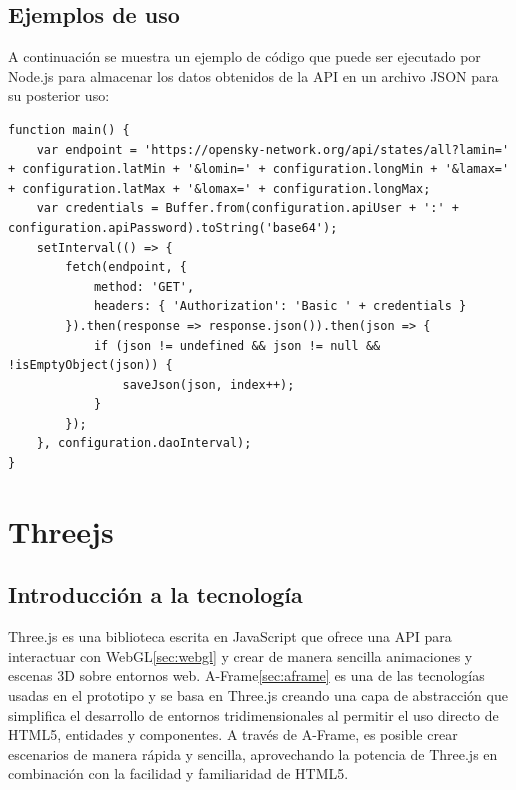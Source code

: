 \documentclass[a4paper, 11pt]{book}
\begin{document}
\subsection{Ejemplos de uso}
A continuación se muestra un ejemplo de código que puede ser ejecutado por Node.js para almacenar los datos obtenidos de la API en un archivo JSON para su posterior uso:
\begin{verbatim}
function main() {
    var endpoint = 'https://opensky-network.org/api/states/all?lamin=' + configuration.latMin + '&lomin=' + configuration.longMin + '&lamax=' + configuration.latMax + '&lomax=' + configuration.longMax;
    var credentials = Buffer.from(configuration.apiUser + ':' + configuration.apiPassword).toString('base64');
    setInterval(() => {
        fetch(endpoint, {
            method: 'GET',
            headers: { 'Authorization': 'Basic ' + credentials }
        }).then(response => response.json()).then(json => {
            if (json != undefined && json != null && !isEmptyObject(json)) {
                saveJson(json, index++);
            }
        });
    }, configuration.daoInterval);
}
\end{verbatim}
\label{sec:nodejs}
\section{Threejs}
\label{sec:threejs}
\subsection{Introducción a la tecnología}
Three.js es una biblioteca escrita en JavaScript que ofrece una API para interactuar con WebGL\ref{sec:webgl} y crear de manera sencilla animaciones y escenas 3D sobre entornos web. A-Frame\ref{sec:aframe} es una de las tecnologías usadas en el prototipo y se basa en Three.js creando una capa de abstracción que simplifica el desarrollo de entornos tridimensionales al permitir el uso directo de HTML5, entidades y componentes. A través de A-Frame, es posible crear escenarios de manera rápida y sencilla, aprovechando la potencia de Three.js en combinación con la facilidad y familiaridad de HTML5.
\end{document}

